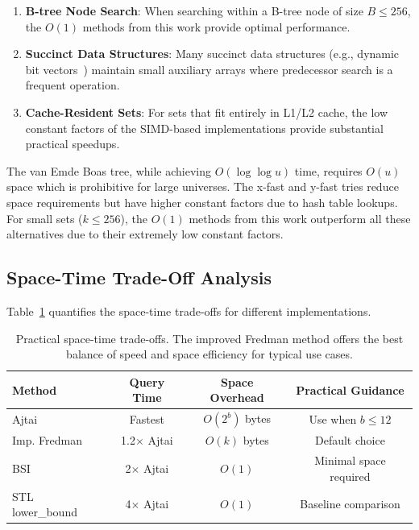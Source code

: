 \begin{enumerate}
    \item \textbf{B-tree Node Search}: When searching within a B-tree node of size $B \leq 256$, the $O(1)$ methods from this work provide optimal performance.

    \item \textbf{Succinct Data Structures}: Many succinct data structures (e.g., dynamic bit vectors~\cite{Prezza17}) maintain small auxiliary arrays where predecessor search is a frequent operation.

    \item \textbf{Cache-Resident Sets}: For sets that fit entirely in L1/L2 cache, the low constant factors of the SIMD-based implementations provide substantial practical speedups.
\end{enumerate}

The van Emde Boas tree, while achieving $O(\log\log u)$ time, requires $O(u)$ space which is prohibitive for large universes. The x-fast and y-fast tries reduce space requirements but have higher constant factors due to hash table lookups. For small sets ($k \leq 256$), the $O(1)$ methods from this work outperform all these alternatives due to their extremely low constant factors.

\subsection{Space-Time Trade-Off Analysis}

Table~\ref{tab:space-time} quantifies the space-time trade-offs for different implementations.

\begin{table}[H]
\centering
\begin{tabular}{|l|c|c|c|}
\hline
\textbf{Method} & \textbf{Query Time} & \textbf{Space Overhead} & \textbf{Practical Guidance} \\
\hline
Ajtai & Fastest & $O(2^b)$ bytes & Use when $b \leq 12$ \\
Imp. Fredman & 1.2$\times$ Ajtai & $O(k)$ bytes & Default choice \\
BSI & 2$\times$ Ajtai & $O(1)$ & Minimal space required \\
STL lower\_bound & 4$\times$ Ajtai & $O(1)$ & Baseline comparison \\
\hline
\end{tabular}
\caption{Practical space-time trade-offs. The improved Fredman method offers the best balance of speed and space efficiency for typical use cases.}
\label{tab:space-time}
\end{table}

